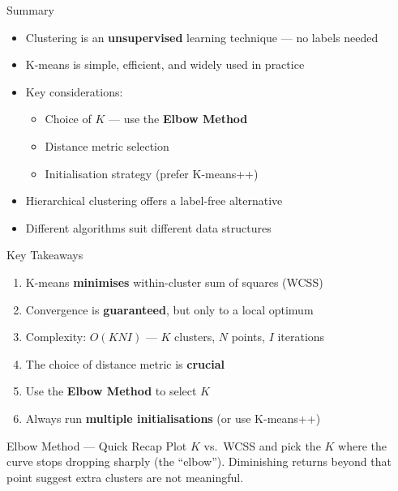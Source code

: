 \documentclass{beamer}
\begin{document}
\begin{frame}{Summary}

\begin{itemize}
  \setlength\itemsep{0.45em}
  \item Clustering is an \textbf{unsupervised} learning technique — no labels needed
  \item K-means is simple, efficient, and widely used in practice
  \item Key considerations:
        \begin{itemize}
          \item Choice of $K$ — use the \textcolor{accentcol}{\textbf{Elbow Method}}
          \item Distance metric selection
          \item Initialisation strategy (prefer K-means++)
        \end{itemize}
  \item Hierarchical clustering offers a label-free alternative
  \item Different algorithms suit different data structures
\end{itemize}

\end{frame}

\begin{frame}{Key Takeaways}

\begin{enumerate}
  \setlength\itemsep{0.45em}
  \item K-means \textbf{minimises} within-cluster sum of squares (WCSS)
  \item Convergence is \textbf{guaranteed}, but only to a \alert{local} optimum
  \item Complexity: $O(KNI)$ — $K$ clusters, $N$ points, $I$ iterations
  \item The choice of distance metric is \textbf{crucial}
  \item Use the \textcolor{accentcol}{\textbf{Elbow Method}} to select $K$
  \item Always run \textbf{multiple initialisations} (or use K-means++)
\end{enumerate}

\bigskip
\begin{block}{Elbow Method — Quick Recap}
Plot $K$ vs.\ WCSS and pick the $K$ where the curve stops dropping sharply (the ``elbow''). Diminishing returns beyond that point suggest extra clusters are not meaningful.
\end{block}

\end{frame}
\end{document}
